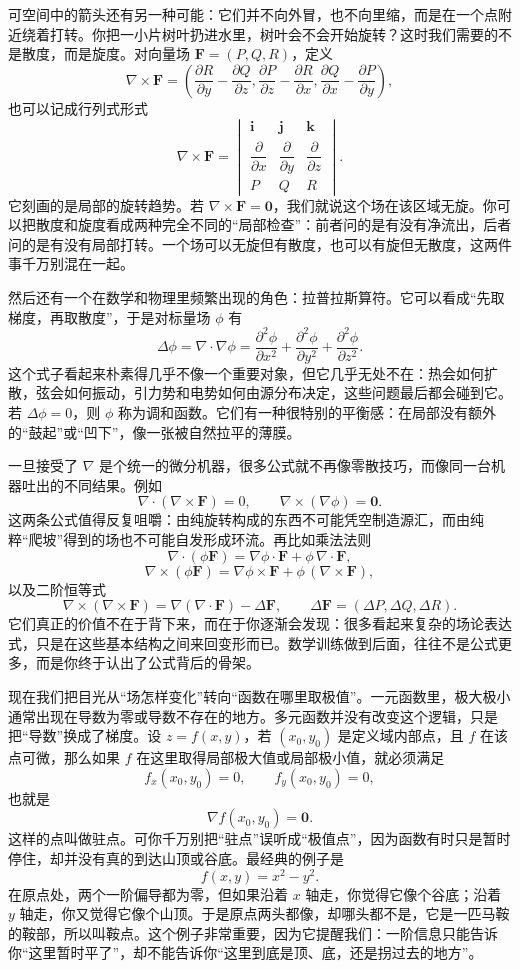 \documentclass[UTF8]{ctexbook}
\begin{document}
可空间中的箭头还有另一种可能：它们并不向外冒，也不向里缩，而是在一个点附近绕着打转。你把一小片树叶扔进水里，树叶会不会开始旋转？这时我们需要的不是散度，而是旋度。对向量场 $\mathbf{F}=(P,Q,R)$，定义
\[
\nabla\times\mathbf{F}=
\left(
\frac{\partial R}{\partial y}-\frac{\partial Q}{\partial z},
\frac{\partial P}{\partial z}-\frac{\partial R}{\partial x},
\frac{\partial Q}{\partial x}-\frac{\partial P}{\partial y}
\right),
\]
也可以记成行列式形式
\[
\nabla\times\mathbf{F}=
\begin{vmatrix}
\mathbf{i}&\mathbf{j}&\mathbf{k}\\
\dfrac{\partial}{\partial x}&\dfrac{\partial}{\partial y}&\dfrac{\partial}{\partial z}\\
P&Q&R
\end{vmatrix}.
\]
它刻画的是局部的旋转趋势。若 $\nabla\times\mathbf{F}=\mathbf{0}$，我们就说这个场在该区域无旋。你可以把散度和旋度看成两种完全不同的“局部检查”：前者问的是有没有净流出，后者问的是有没有局部打转。一个场可以无旋但有散度，也可以有旋但无散度，这两件事千万别混在一起。

然后还有一个在数学和物理里频繁出现的角色：拉普拉斯算符。它可以看成“先取梯度，再取散度”，于是对标量场 $\phi$ 有
\[
\Delta\phi=\nabla\cdot\nabla\phi
=\frac{\partial^2\phi}{\partial x^2}
+\frac{\partial^2\phi}{\partial y^2}
+\frac{\partial^2\phi}{\partial z^2}.
\]
这个式子看起来朴素得几乎不像一个重要对象，但它几乎无处不在：热会如何扩散，弦会如何振动，引力势和电势如何由源分布决定，这些问题最后都会碰到它。若 $\Delta\phi=0$，则 $\phi$ 称为调和函数。它们有一种很特别的平衡感：在局部没有额外的“鼓起”或“凹下”，像一张被自然拉平的薄膜。

一旦接受了 $\nabla$ 是个统一的微分机器，很多公式就不再像零散技巧，而像同一台机器吐出的不同结果。例如
\[
\nabla\cdot(\nabla\times\mathbf{F})=0,
\qquad
\nabla\times(\nabla\phi)=\mathbf{0}.
\]
这两条公式值得反复咀嚼：由纯旋转构成的东西不可能凭空制造源汇，而由纯粹“爬坡”得到的场也不可能自发形成环流。再比如乘法法则
\[
\nabla\cdot(\phi\mathbf{F})=\nabla\phi\cdot\mathbf{F}+\phi\,\nabla\cdot\mathbf{F},
\]
\[
\nabla\times(\phi\mathbf{F})=\nabla\phi\times\mathbf{F}+\phi\,(\nabla\times\mathbf{F}),
\]
以及二阶恒等式
\[
\nabla\times(\nabla\times\mathbf{F})
=\nabla(\nabla\cdot\mathbf{F})-\Delta\mathbf{F},
\qquad
\Delta\mathbf{F}=(\Delta P,\Delta Q,\Delta R).
\]
它们真正的价值不在于背下来，而在于你逐渐会发现：很多看起来复杂的场论表达式，只是在这些基本结构之间来回变形而已。数学训练做到后面，往往不是公式更多，而是你终于认出了公式背后的骨架。

现在我们把目光从“场怎样变化”转向“函数在哪里取极值”。一元函数里，极大极小通常出现在导数为零或导数不存在的地方。多元函数并没有改变这个逻辑，只是把“导数”换成了梯度。设 $z=f(x,y)$，若 $(x_0,y_0)$ 是定义域内部点，且 $f$ 在该点可微，那么如果 $f$ 在这里取得局部极大值或局部极小值，就必须满足
\[
f_x(x_0,y_0)=0,\qquad f_y(x_0,y_0)=0,
\]
也就是
\[
\nabla f(x_0,y_0)=\mathbf{0}.
\]
这样的点叫做驻点。可你千万别把“驻点”误听成“极值点”，因为函数有时只是暂时停住，却并没有真的到达山顶或谷底。最经典的例子是
\[
f(x,y)=x^2-y^2.
\]
在原点处，两个一阶偏导都为零，但如果沿着 $x$ 轴走，你觉得它像个谷底；沿着 $y$ 轴走，你又觉得它像个山顶。于是原点两头都像，却哪头都不是，它是一匹马鞍的鞍部，所以叫鞍点。这个例子非常重要，因为它提醒我们：一阶信息只能告诉你“这里暂时平了”，却不能告诉你“这里到底是顶、底，还是拐过去的地方”。
\end{document}
